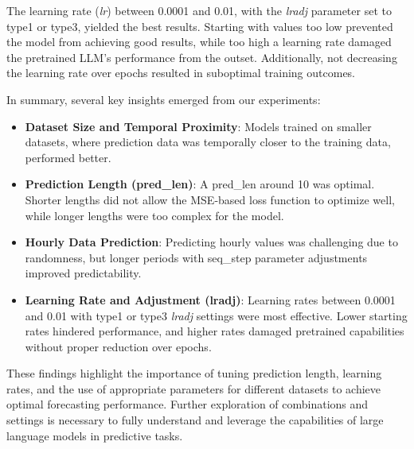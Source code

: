 The learning rate (\textit{lr}) between 0.0001 and 0.01, with the \textit{lradj} parameter set to type1 or type3, yielded the best results. Starting with values too low prevented the model from achieving good results, while too high a learning rate damaged the pretrained LLM’s performance from the outset. Additionally, not decreasing the learning rate over epochs resulted in suboptimal training outcomes.

In summary, several key insights emerged from our experiments:

\begin{itemize}
	\item \textbf{Dataset Size and Temporal Proximity}: Models trained on smaller datasets, where prediction data was temporally closer to the training data, performed better.
	\item \textbf{Prediction Length (pred\_len)}: A pred\_len around 10 was optimal. Shorter lengths did not allow the MSE-based loss function to optimize well, while longer lengths were too complex for the model.
	\item \textbf{Hourly Data Prediction}: Predicting hourly values was challenging due to randomness, but longer periods with seq\_step parameter adjustments improved predictability.
	\item \textbf{Learning Rate and Adjustment (lradj)}: Learning rates between 0.0001 and 0.01 with type1 or type3 \textit{lradj} settings were most effective. Lower starting rates hindered performance, and higher rates damaged pretrained capabilities without proper reduction over epochs.
\end{itemize}

These findings highlight the importance of tuning prediction length, learning rates, and the use of appropriate parameters for different datasets to achieve optimal forecasting performance. Further exploration of combinations and settings is necessary to fully understand and leverage the capabilities of large language models in predictive tasks.

